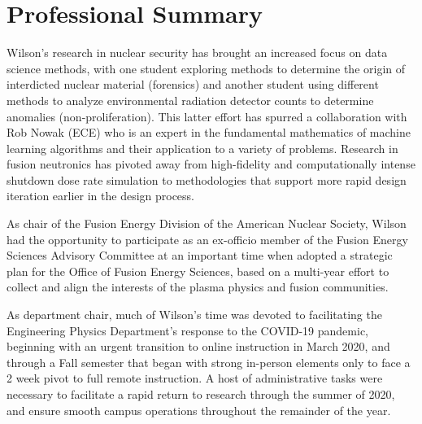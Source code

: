 \section{Professional Summary}

Wilson's research in nuclear security has brought an increased focus on data
science methods, with one student exploring methods to determine the origin of
interdicted nuclear material (forensics) and another student using different
methods to analyze environmental radiation detector counts to determine
anomalies (non-proliferation).  This latter effort has spurred a collaboration
with Rob Nowak (ECE) who is an expert in the fundamental mathematics of machine
learning algorithms and their application to a variety of problems.  Research in
fusion neutronics has pivoted away from high-fidelity and computationally
intense shutdown dose rate simulation to methodologies that support more rapid
design iteration earlier in the design process. 

As chair of the Fusion Energy Division of the American Nuclear Society, Wilson
had the opportunity to participate as an ex-officio member of the Fusion Energy
Sciences Advisory Committee at an important time when adopted a strategic plan
for the Office of Fusion Energy Sciences, based on a multi-year effort to
collect and align the interests of the plasma physics and fusion communities.

As department chair, much of Wilson's time was devoted to facilitating the
Engineering Physics Department's response to the COVID-19 pandemic, beginning
with an urgent transition to online instruction in March 2020, and through a
Fall semester that began with strong in-person elements only to face a 2 week
pivot to full remote instruction.  A host of administrative tasks were necessary
to facilitate a rapid return to research through the summer of 2020, and ensure
smooth campus operations throughout the remainder of the year.